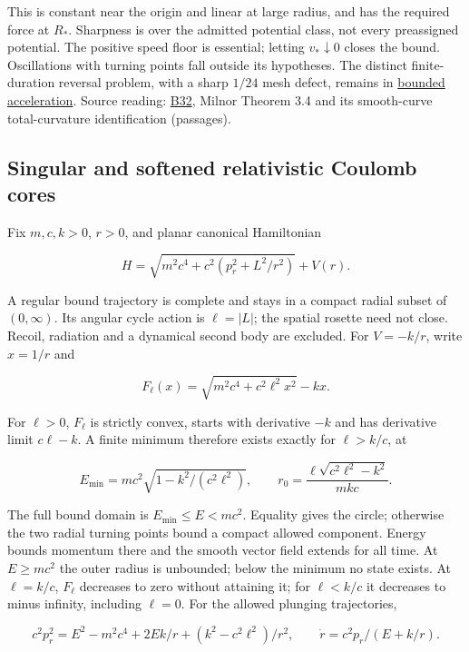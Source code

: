 \documentclass[11pt,a4paper]{article}
\begin{document}
This is constant near the origin and linear at large radius, and has the
required force at \(R_*\). Sharpness is over the admitted potential
class, not every preassigned potential. The positive speed floor is
essential; letting \(v_*\downarrow0\) closes the bound. Oscillations
with turning points fall outside its hypotheses. The distinct
finite-duration reversal problem, with a sharp \(1/24\) mesh defect,
remains in \href{bounded-acceleration-return.md}{bounded acceleration}.
Source reading: \href{../references/batches/B32.md}{B32}, Milnor Theorem
3.4 and its smooth-curve total-curvature identification (passages).

\hypertarget{singular-and-softened-relativistic-coulomb-cores}{%
\subsection{Singular and softened relativistic Coulomb
cores}\label{singular-and-softened-relativistic-coulomb-cores}}

Fix \(m,c,k>0\), \(r>0\), and planar canonical Hamiltonian

\[H=\sqrt{m^2c^4+c^2(p_r^2+L^2/r^2)}+V(r).\]

A regular bound trajectory is complete and stays in a compact radial
subset of \((0,\infty)\). Its angular cycle action is \(\ell=|L|\); the
spatial rosette need not close. Recoil, radiation and a dynamical second
body are excluded. For \(V=-k/r\), write \(x=1/r\) and

\[F_\ell(x)=\sqrt{m^2c^4+c^2\ell^2x^2}-kx.\]

For \(\ell>0\), \(F_\ell\) is strictly convex, starts with derivative
\(-k\) and has derivative limit \(c\ell-k\). A finite minimum therefore
exists exactly for \(\ell>k/c\), at

\[E_{\min}=mc^2\sqrt{1-k^2/(c^2\ell^2)},\qquad
r_0=\frac{\ell\sqrt{c^2\ell^2-k^2}}{mkc}.\]

The full bound domain is \(E_{\min}\le E<mc^2\). Equality gives the
circle; otherwise the two radial turning points bound a compact allowed
component. Energy bounds momentum there and the smooth vector field
extends for all time. At \(E\ge mc^2\) the outer radius is unbounded;
below the minimum no state exists. At \(\ell=k/c\), \(F_\ell\) decreases
to zero without attaining it; for \(\ell<k/c\) it decreases to minus
infinity, including \(\ell=0\). For the allowed plunging trajectories,

\[c^2p_r^2=E^2-m^2c^4+2Ek/r+(k^2-c^2\ell^2)/r^2,\qquad
\dot r=c^2p_r/(E+k/r).\]
\end{document}
